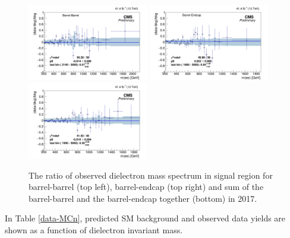 \begin{figure}[!htbp]
  \begin{center}
    \includegraphics[width=0.47\textwidth]{figures/Zprime/2017/mass/SignalRegionHistEBEB}
    \includegraphics[width=0.47\textwidth]{figures/Zprime/2017/mass/SignalRegionHistEBEE}
    \includegraphics[width=0.47\textwidth]{figures/Zprime/2017/mass/SignalRegionHist}
    \caption{The ratio of observed dielectron mass spectrum in signal region for barrel-barrel (top left), barrel-endcap (top right) and sum of the barrel-barrel and the barrel-endcap together (bottom) in 2017.}
    \label{massratio_2017}
  \end{center}
\end{figure}



In Table \ref{data-MCn}, predicted SM background and observed data yields are shown as a function of dielectron invariant mass.

